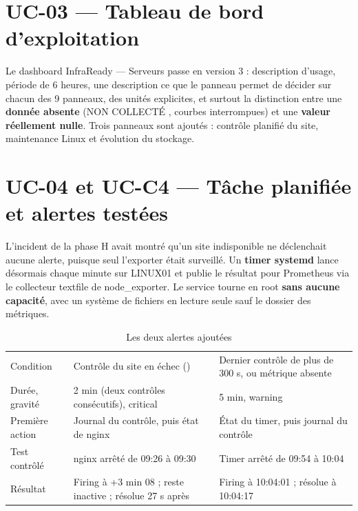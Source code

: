 \section{UC-03 — Tableau de bord d'exploitation}

Le dashboard \og InfraReady — Serveurs \fg{} passe en version 3 : description d'usage, période de
6 heures, une description \og ce que le panneau permet de décider \fg{} sur chacun des 9 panneaux,
des unités explicites, et surtout la distinction entre une \textbf{donnée absente} (\og NON
COLLECTÉ \fg{}, courbes interrompues) et une \textbf{valeur réellement nulle}. Trois panneaux sont
ajoutés : contrôle planifié du site, maintenance Linux et évolution du stockage.


\section{UC-04 et UC-C4 — Tâche planifiée et alertes testées}

L'incident de la phase H avait montré qu'un site indisponible ne déclenchait aucune alerte, puisque
seul l'exporter était surveillé. Un \textbf{timer systemd} lance désormais 
chaque minute sur LINUX01 et publie le résultat pour Prometheus via le collecteur \og textfile \fg{}
de node\_exporter. Le service tourne en root \textbf{sans aucune capacité}, avec un système de
fichiers en lecture seule sauf le dossier des métriques.


\begin{table}[H]
\centering
\caption{Les deux alertes ajoutées}\label{tab:s6-alertes}
\begin{tabularx}{\linewidth}{@{}P{2.6cm}LL@{}}
\toprule
 &  &  \\
\midrule
Condition & Contrôle du site en échec () & Dernier contrôle de plus de 300 s, ou métrique absente \\
Durée, gravité & 2 min (deux contrôles consécutifs), critical & 5 min, warning \\
Première action & Journal du contrôle, puis état de nginx & État du timer, puis journal du contrôle \\
Test contrôlé & nginx arrêté de 09:26 à 09:30 & Timer arrêté de 09:54 à 10:04 \\
Résultat & Firing à +3 min 08 ;  reste inactive ; résolue 27 s après & Firing à 10:04:01 ; résolue à 10:04:17 \\
\bottomrule
\end{tabularx}
\end{table}

